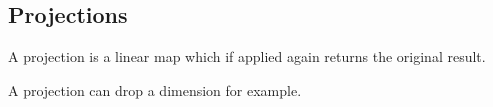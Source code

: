 
\subsection{Projections}

A projection is a linear map which if applied again returns the original result.

A projection can drop a dimension for example.
	

